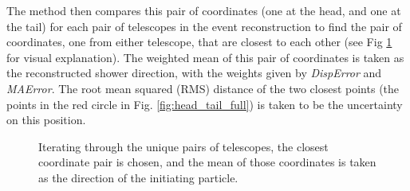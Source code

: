 \documentclass[main.tex]{subfiles}
\begin{document}
The method then compares this pair of coordinates (one at the head, and one at the tail) for each pair of telescopes in the event reconstruction to find the pair of coordinates, one from either telescope, that are closest to each other (see Fig \ref{fig:head_tail} for visual explanation). The weighted mean of this pair of coordinates is taken as the reconstructed shower direction, with the weights given by {\it DispError} and {\it MAError}. The root mean squared (RMS) distance of the two closest points (the points in the red circle in Fig. \ref{fig:head_tail_full}) is taken to be the uncertainty on this position.
\begin{figure}[htbp]
  \centering
{}
  \caption[Combining multiple telescopes in \disp reconstruction.]{Iterating through the unique pairs of telescopes, the closest coordinate pair is chosen, and the mean of those coordinates is taken as the direction of the initiating particle.}
  \label{fig:head_tail}
\end{figure}
\end{document}
